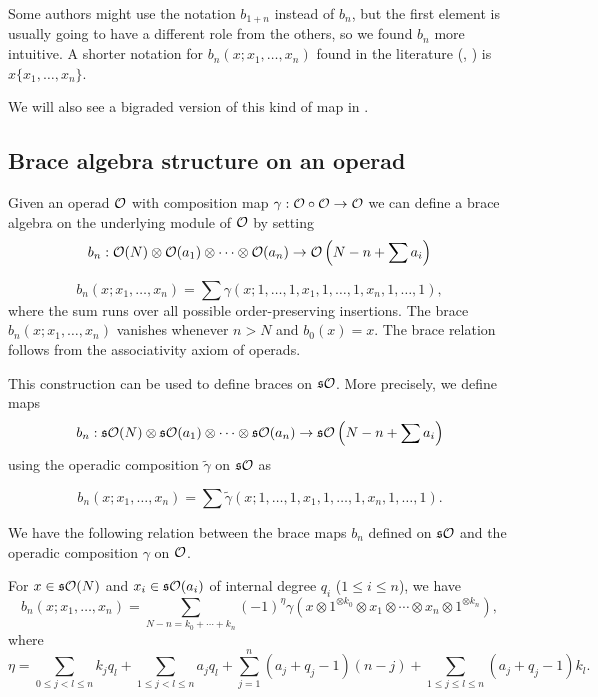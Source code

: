\documentclass[Thesis.tex]{subfiles}
\begin{document}
\begin{remark}
Some authors might use the notation $b_{1+n}$ instead of $b_n$, but the first element is usually going to have a different role from the others, so we found $b_n$ more intuitive. A shorter notation for $b_n(x;x_1,\dots,x_n)$ found in the literature (\cite{GV}, \cite{getzler}) is $x\{x_1,\dots, x_n\}$. 
\end{remark}

We will also see a bigraded version of this kind of map in .
\subsection{Brace algebra structure on an operad}


Given an operad ${\mathcal O}$ with composition map $\gamma:{\mathcal O}\circ{\mathcal O}\to{\mathcal O}$ we can define a brace algebra on the underlying module of ${\mathcal O}$ by setting
\[b_n:{\mathcal O}(N)\otimes{\mathcal O}(a_1)\otimes\cdots\otimes{\mathcal O}(a_n)\to{\mathcal O}\left(N-n+\sum a_i\right)\]

\[b_n(x;x_1,\dots, x_n)=\sum\gamma(x;1,\dots,1,x_1,1,\dots,1,x_n,1,\dots,1),\]
where the sum runs over all possible order-preserving insertions. The brace $b_n(x;x_1,\dots,x_n)$ vanishes whenever $n>N$ and $b_0(x)=x$. The brace relation follows from the associativity axiom of operads.


This construction can  be used to define braces on $\mathfrak{s}{\mathcal O}$. More precisely, we define maps 
\[b_n:\mathfrak{s}{\mathcal O}(N)\otimes\mathfrak{s}{\mathcal O}(a_1)\otimes\cdots\otimes\mathfrak{s}{\mathcal O}(a_n)\to\mathfrak{s}{\mathcal O}\left(N-n+\sum a_i\right)\]
using the operadic composition $\tilde{\gamma}$ on $\mathfrak{s}{\mathcal O}$ as

\[b_n(x;x_1,\dots,x_n)=\sum\tilde{\gamma}(x;1,\dots,1,x_1,1,\dots,1,x_n,1,\dots,1).\]

We have the following relation between the brace maps $b_n$ defined on $\mathfrak{s}{\mathcal O}$ and the operadic composition $\gamma$ on ${\mathcal O}$. 
\begin{propo}\label{bracesign}
For $x\in \mathfrak{s}{\mathcal O}(N)$ and $x_i\in\mathfrak{s}{\mathcal O}(a_i)$ of internal degree $q_i$ ($1\leq i\leq n$), we have
\[b_n(x;x_1,\dots,x_n)=\sum_{N-n=k_0+\cdots+k_n} (-1)^\eta \gamma
(x\otimes 1^{\otimes k_0}\otimes x_1\otimes \cdots\otimes x_n\otimes1^{\otimes k_n}),\]
where 
\[\eta=\sum_{0\leq j<l\leq n}k_jq_l+\sum_{1\leq j<l\leq n}a_jq_l+\sum_{j=1}^n (a_j+q_j-1)(n-j)+\sum_{1\leq j\leq l\leq n} (a_j+q_j-1)k_l.\]
\end{propo}
\end{document}
